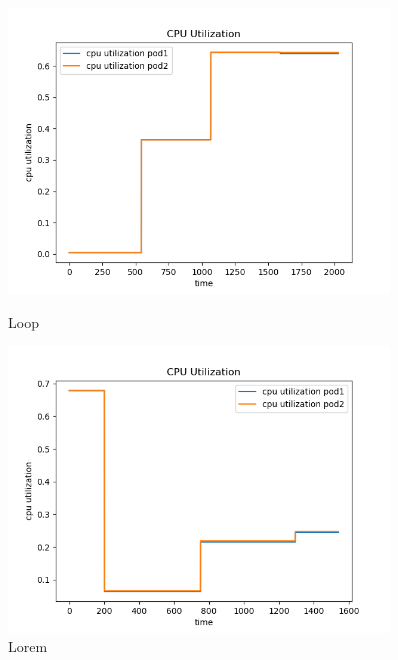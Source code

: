 \begin{figure}[h]
    \begin{minipage}[t]{0.5\textwidth}
        \centering
        \includegraphics[width=0.9\textwidth]{../sample_results/loop/two-pod-diff-node/cpu-utilization-two-pod-diff-node.png}
        \caption{Loop}
    \end{minipage}
    \hfill
    \begin{minipage}[t]{0.5\textwidth}
        \centering
        \includegraphics[width=0.9\textwidth]{../sample_results/lorem/two-pod-diff-node/cpu-utilization-two-pod-diff-node.png}
        \caption{Lorem}
    \end{minipage}
\end{figure}

\newpage

